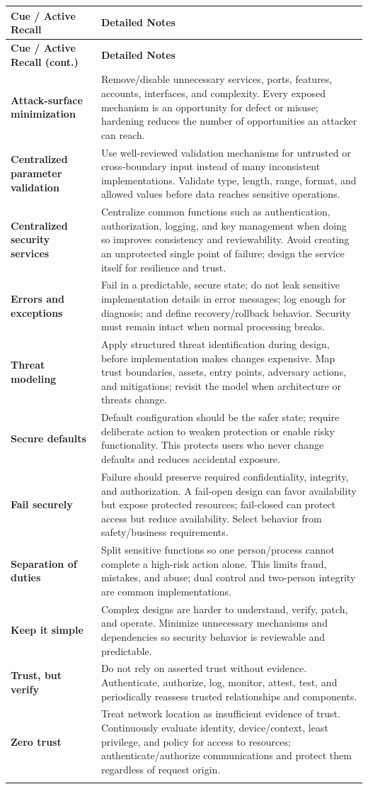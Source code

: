\documentclass[10pt,letterpaper]{article}
\makeatletter
\newenvironment{cornell}{\rowcolors{2}{white}{notebg}\begin{longtable}{@{}>{\raggedright\arraybackslash\columncolor{cuebg}\color{navy}\bfseries}p{0.285\textwidth}>{\raggedright\arraybackslash}p{0.65\textwidth}@{}}
\rowcolor{navy}\color{white}\textbf{Cue / Active Recall} & \color{white}\textbf{Detailed Notes}\\ \hline\endfirsthead
\rowcolor{navy}\color{white}\textbf{Cue / Active Recall (cont.)} & \color{white}\textbf{Detailed Notes}\\ \hline\endhead}{\end{longtable}}
\newcommand{\noterow}[2]{#1 & #2\\\arrayrulecolor{line}\hline}
\makeatother
\begin{document}
\begin{cornell}
\noterow{Attack-surface minimization}{Remove/disable unnecessary services, ports, features, accounts, interfaces, and complexity. Every exposed mechanism is an opportunity for defect or misuse; hardening reduces the number of opportunities an attacker can reach.}
\noterow{Centralized parameter validation}{Use well-reviewed validation mechanisms for untrusted or cross-boundary input instead of many inconsistent implementations. Validate type, length, range, format, and allowed values before data reaches sensitive operations.}
\noterow{Centralized security services}{Centralize common functions such as authentication, authorization, logging, and key management when doing so improves consistency and reviewability. Avoid creating an unprotected single point of failure; design the service itself for resilience and trust.}
\noterow{Errors and exceptions}{Fail in a predictable, secure state; do not leak sensitive implementation details in error messages; log enough for diagnosis; and define recovery/rollback behavior. Security must remain intact when normal processing breaks.}
\noterow{Threat modeling}{Apply structured threat identification during design, before implementation makes changes expensive. Map trust boundaries, assets, entry points, adversary actions, and mitigations; revisit the model when architecture or threats change.}
\noterow{Secure defaults}{Default configuration should be the safer state; require deliberate action to weaken protection or enable risky functionality. This protects users who never change defaults and reduces accidental exposure.}
\noterow{Fail securely}{Failure should preserve required confidentiality, integrity, and authorization. A fail-open design can favor availability but expose protected resources; fail-closed can protect access but reduce availability. Select behavior from safety/business requirements.}
\noterow{Separation of duties}{Split sensitive functions so one person/process cannot complete a high-risk action alone. This limits fraud, mistakes, and abuse; dual control and two-person integrity are common implementations.}
\noterow{Keep it simple}{Complex designs are harder to understand, verify, patch, and operate. Minimize unnecessary mechanisms and dependencies so security behavior is reviewable and predictable.}
\noterow{Trust, but verify}{Do not rely on asserted trust without evidence. Authenticate, authorize, log, monitor, attest, test, and periodically reassess trusted relationships and components.}
\noterow{Zero trust}{Treat network location as insufficient evidence of trust. Continuously evaluate identity, device/context, least privilege, and policy for access to resources; authenticate/authorize communications and protect them regardless of request origin.}

\end{cornell}
\end{document}
